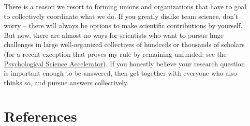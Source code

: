\documentclass[
]{krantz}
\newlength{\cslhangindent}
\newlength{\cslentryspacingunit} %
\newenvironment{CSLReferences}[2] %
 {%
  \setlength{\parindent}{0pt}
  \ifodd #1
  \let\oldpar\par
  \def\par{\hangindent=\cslhangindent\oldpar}
  \fi
  \setlength{\parskip}{#2\cslentryspacingunit}
 }%
 {}
\begin{document}
There is a reason we resort to forming unions and organizations that have to goal to collectively coordinate what we do. If you greatly dislike team science, don't worry -- there will always be options to make scientific contributions by yourself. But now, there are almost no ways for scientists who want to pursue huge challenges in large well-organized collectives of hundreds or thousands of scholars (for a recent exception that proves my rule by remaining unfunded: see the \href{https://psysciacc.org/}{Psychological Science Accelerator}). If you honestly believe your research question is important enough to be answered, then get together with everyone who also thinks so, and pursue answers collectively.

\hypertarget{references}{%
\chapter{References}\label{references}}

\begingroup

\hypertarget{refs}{}
\begin{CSLReferences}{0}{0}
\end{CSLReferences}

\endgroup

  
\end{document}
